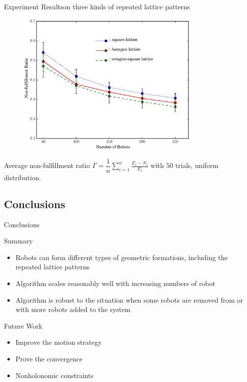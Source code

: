 \documentclass[10pt]{beamer}
\begin{document}
\begin{frame}{Experiment Results}{on three kinds of repeated
lattice patterns}
%
%    
\begin{figure}
  \centering
  \includegraphics[width=0.8\textwidth]{figs/expqual}
\end{figure}
\begin{center}
  \footnotesize{Average non-fulfillment ratio $\Gamma = \dfrac{1}{n}\sum\limits_{i=1}^n \frac{E_i - N_i}{E_i}$ with $50$ trials, uniform distribution.}  
\end{center}

\end{frame}

\subsection{Conclusions}
\begin{frame}{Conclusions}{}
\begin{block}{Summary}
  \begin{itemize}
  \item Robots can form different types of geometric formations,
    including the repeated lattice patterns
  \item Algorithm scales reasonably well with increasing numbers of
    robot
  \item Algorithm is robust to the situation when some robots are removed from or
    with more robots added to the system
  \end{itemize}
\end{block}
\begin{block}{Future Work}
  \begin{itemize}
  \item Improve the motion strategy
  \item Prove the convergence
  \item Nonholonomic constraints
  \end{itemize}
\end{block}
\end{frame}
\end{document}
